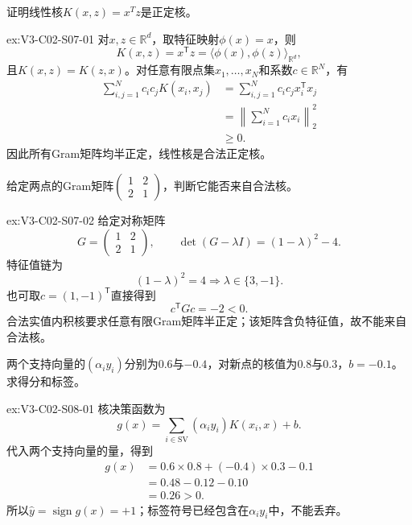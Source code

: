 \begin{SLChapterExercisePairSection}
\begin{exercise}\label{ex:V3-C02-S07-01}
证明线性核$K(x,z)=x^Tz$是正定核。
\end{exercise}
\ifSLFullEdition
{}\label{sol:V3-C02-S07-01}
\begin{chapterexercisesolution}{ex:V3-C02-S07-01}
对$x,z\in\mathbb R^d$，取特征映射$\phi(x)=x$，则
\[
K(x,z)=x^{\mathsf T}z
=\langle\phi(x),\phi(z)\rangle_{\mathbb R^d},
\]
且$K(x,z)=K(z,x)$。对任意有限点集$x_1,\ldots,x_N$和系数$c\in\mathbb R^N$，有
\[
\begin{aligned}
\sum_{i,j=1}^{N}c_ic_jK(x_i,x_j)
&=\sum_{i,j=1}^{N}c_ic_jx_i^{\mathsf T}x_j\\
&=\left\lVert\sum_{i=1}^{N}c_ix_i\right\rVert_2^2\\
&\geq0.
\end{aligned}
\]
因此所有Gram矩阵均半正定，线性核是合法正定核。
\end{chapterexercisesolution}
\fi

\begin{exercise}\label{ex:V3-C02-S07-02}
给定两点的Gram矩阵$\begin{pmatrix}1&2\\2&1\end{pmatrix}$，判断它能否来自合法核。
\end{exercise}
\ifSLFullEdition
{}\label{sol:V3-C02-S07-02}
\begin{chapterexercisesolution}{ex:V3-C02-S07-02}
给定对称矩阵
\[
G=\begin{pmatrix}1&2\\2&1\end{pmatrix},
\qquad
\det(G-\lambda I)=(1-\lambda)^2-4.
\]
特征值链为
\[
(1-\lambda)^2=4
\Longrightarrow \lambda\in\{3,-1\}.
\]
也可取$c=(1,-1)^{\mathsf T}$直接得到
\[
c^{\mathsf T}Gc=-2<0.
\]
合法实值内积核要求任意有限Gram矩阵半正定；该矩阵含负特征值，故不能来自合法核。
\end{chapterexercisesolution}
\fi

\begin{exercise}\label{ex:V3-C02-S08-01}
两个支持向量的$(\alpha_i y_i)$分别为$0.6$与$-0.4$，对新点的核值为$0.8$与$0.3$，$b=-0.1$。求得分和标签。
\end{exercise}
\ifSLFullEdition
{}\label{sol:V3-C02-S08-01}
\begin{chapterexercisesolution}{ex:V3-C02-S08-01}
核决策函数为
\[
g(x)=\sum_{i\in\mathrm{SV}}(\alpha_i y_i)K(x_i,x)+b.
\]
代入两个支持向量的量，得到
\[
\begin{aligned}
g(x)
&=0.6\times0.8+(-0.4)\times0.3-0.1\\
&=0.48-0.12-0.10\\
&=0.26>0.
\end{aligned}
\]
所以$\widehat y=\operatorname{sign}g(x)=+1$；标签符号已经包含在$\alpha_i y_i$中，不能丢弃。
\end{chapterexercisesolution}
\fi


\end{SLChapterExercisePairSection}
